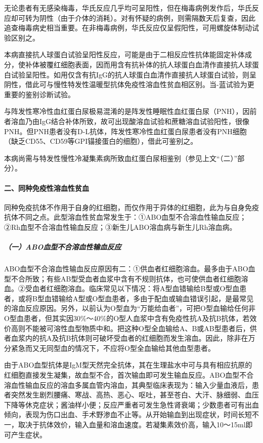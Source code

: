 无论患者有无感染梅毒，华氏反应几乎均可呈阳性，但在梅毒病例发作后，华氏反应却可转为阴性（由于介体的消耗）。对有怀疑的病例，则需隔数天后复查，因此追查梅毒病史相当重要。在非梅毒病例，华氏反应仅呈假阳性，可用螺旋体制动试验区别之。

本病直接抗人球蛋白试验呈阳性反应，可能是由于二相反应性抗体能固定补体成分，使补体被覆红细胞表面，因而用含有抗补体的抗人球蛋白血清作直接抗人球蛋白试验呈阳性。如用仅含有抗IgG的抗人球蛋白血清作直接抗人球蛋白试验，则呈阴性，借此可与慢性特发性温暖型抗体免疫性溶血性贫血相区别。当-蓝试验为更重要的鉴别诊断试验。

与阵发性寒冷性血红蛋白尿极易混淆的是阵发性睡眠性血红蛋白尿（PNH），因前者溶血乃由IgG结合补体所致，故可出现酸溶血试验和蔗糖溶血试验阳性，很像PNH。但PNH患者没有D-L抗体，阵发性寒冷性血红蛋白尿患者没有PNH细胞（缺乏CD55、CD59等GPI锚接蛋白的细胞），借此可鉴别之。

本病尚需与特发性慢性冷凝集素病所致血红蛋白尿相鉴别（参见上文“（二）”部分）。

\paragraph{二、同种免疫性溶血性贫血}

同种免疫抗体不作用于自身的红细胞，而仅作用于异体的红细胞，此为与自身免疫抗体不同之点。此型溶血性贫血常发生于：①ABO血型不合溶血性输血反应；②Rh血型不合溶血性输血反应；③新生儿ABO溶血病与新生儿Rh溶血病。

\subparagraph{（一）ABO血型不合溶血性输血反应}

ABO血型不合溶血性输血反应原因有二：①供血者红细胞溶血。最多由于ABO血型不合所致；有些AB型受血者血浆中含有不规则抗体，也可使供血者红细胞溶血。②受血者红细胞溶血。临床常见以下情况：将A型血错输给B型或O型血患者，或将B型血错输给A型或O型血患者，多由于配血或输血错误引起，是最常见的溶血反应原因。另外，以前认为O型血为“万能给血者”，可把O型血输给任何非O型血患者，但其实因30\%～40\%的O型人血浆中含有免疫性抗A及抗B抗体，若效价高则不能被可溶性血型物质中和。把这种O型全血输给A、B或AB型患者后，供者血浆内的抗A及抗B抗体则可破坏受血者的红细胞而发生溶血。因此，除非在万分紧急而又无同型血的情况下，不应将O型全血输给其他血型患者。

由于ABO血型抗体是IgM型天然完全抗体，其在生理盐水中可与具有相应抗原的红细胞直接发生凝集，故血型不合，首次输血即可发生输血反应。ABO血型不合溶血性输血反应的溶血多属血管内溶血，其典型临床表现为：输入少量血液后，患者突然发生剧烈腰痛、寒战、高热、恶心、呕吐，甚至苍白、大汗、脉细弱、血压下降等休克症状；酱油样小便；反应严重者可发生急性肾衰竭；少数患者可有出血倾向，表现为伤口出血、手术野渗血不止等。从开始输血到出现症状，时间长短不一，取决于抗体效价，输入血量和溶血速度。若凝集素效价高，输入10～15ml即可产生症状。

